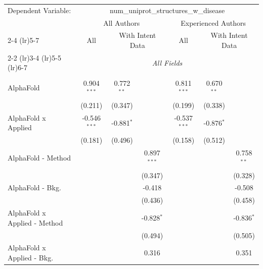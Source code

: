 \begingroup
\centering
\begin{tabular}{lcccccc}
   \tabularnewline \midrule \midrule
   Dependent Variable: & \multicolumn{6}{c}{num\_uniprot\_structures\_w\_disease}\\
 & \multicolumn{3}{c}{All Authors} & \multicolumn{3}{c}{Experienced Authors} \\
\cmidrule(lr){2-4} \cmidrule(lr){5-7}
 & \multicolumn{1}{c}{All} & \multicolumn{2}{c}{With Intent Data} & \multicolumn{1}{c}{All} & \multicolumn{2}{c}{With Intent Data} \\
\cmidrule(lr){2-2} \cmidrule(lr){3-4} \cmidrule(lr){5-5} \cmidrule(lr){6-7}
 & \multicolumn{6}{c}{\textit{All Fields}} \\ \\
   AlphaFold                      & 0.904$^{***}$  & 0.772$^{**}$ &               & 0.811$^{***}$  & 0.670$^{**}$ &   \\   
                                  & (0.211)        & (0.347)      &               & (0.199)        & (0.338)      &   \\   
   AlphaFold x Applied            & -0.546$^{***}$ & -0.881$^{*}$ &               & -0.537$^{***}$ & -0.876$^{*}$ &   \\   
                                  & (0.181)        & (0.496)      &               & (0.158)        & (0.512)      &   \\   
   AlphaFold - Method             &                &              & 0.897$^{***}$ &                &              & 0.758$^{**}$\\   
                                  &                &              & (0.347)       &                &              & (0.328)\\   
   AlphaFold - Bkg.               &                &              & -0.418        &                &              & -0.508\\   
                                  &                &              & (0.436)       &                &              & (0.458)\\   
   AlphaFold x Applied - Method   &                &              & -0.828$^{*}$  &                &              & -0.836$^{*}$\\   
                                  &                &              & (0.494)       &                &              & (0.505)\\   
   AlphaFold x Applied - Bkg.     &                &              & 0.316         &                &              & 0.351\\   

\end{tabular}
